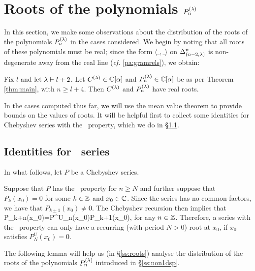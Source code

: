 \section{Roots of the polynomials $P^{(\lambda)}_n$}\label{s:roots}
In this section, we make some observations about the distribution of the roots of the polynomials $P^{(\lambda)}_n$ in the cases considered. We begin by noting that all roots of these polynomials must be real; since the form $\langle \_,\_ \rangle$ on $\Delta^{n}_{(n-2,\lambda)}$ is non-degenerate away from the real line (\textit{cf.} \ref{pa:gramrels}), we obtain:
\begin{corollary} Fix $l$ and let $\lambda\vdash l+2$. Let $C^{(\lambda)}\in \mathbb{C}[\alpha]$ and $P^{(\lambda)}_n\in \mathbb{C}[\alpha]$ be as per Theorem \ref{thm:main}, with $n\geq l+4$. Then $C^{(\lambda)}$ and $P^{(\lambda)}_n$ have real roots.   
\end{corollary}
In the cases computed thus far, we will use the mean value theorem to provide bounds on the values of roots. It will be helpful first to collect some identities for Chebyshev series with the \ramping\ property, which we do in \S\ref{ss:rampingroots}.


\subsection{Identities for \ramping\ series}\label{ss:rampingroots}
In what follows, let $P$ be a Chebyshev series.

\mdef\label{pa:roots} 
Suppose that $P$ has the \ramping\ property for $n\geq N$ and further suppose that $P_{k}(x_0)=0$ for some $k\in \mathbb{Z}$ and $x_0\in \mathbb{C}$. Since the series has no common factors, we have that $P_{k\pm 1}(x_0)\neq 0$. The Chebyshev recursion then implies that 
\beq
    P_{k+n}(x_0)=P^U_n(x_0)P_{k+1}(x_0),  \label{eq:chebyx0}
\eq
for any $n\in \mathbb{Z}$. Therefore, a series with the \ramping\ property can only have a recurring (with period $N>0$) root at $x_0$, if $x_0$ satisfies $P^U_N(x_0)=0$. 

The following lemma will help us (in \S\ref{ss:roots}) analyse the distribution of the roots of the polynomials $P^{(\lambda)}_n$ introduced in \S\ref{ss:non1dsp}.

